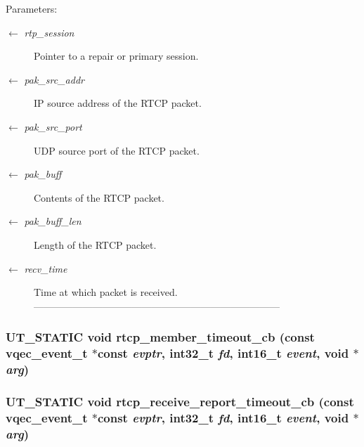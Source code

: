 \begin{Desc}
\item[Parameters:]
\begin{description}
\item[\mbox{$\leftarrow$} {\em rtp\_\-session}]Pointer to a repair or primary session. \item[\mbox{$\leftarrow$} {\em pak\_\-src\_\-addr}]IP source address of the RTCP packet. \item[\mbox{$\leftarrow$} {\em pak\_\-src\_\-port}]UDP source port of the RTCP packet. \item[\mbox{$\leftarrow$} {\em pak\_\-buff}]Contents of the RTCP packet. \item[\mbox{$\leftarrow$} {\em pak\_\-buff\_\-len}]Length of the RTCP packet. \item[\mbox{$\leftarrow$} {\em recv\_\-time}]Time at which packet is received. --------------------------------------------------------------------------- \end{description}
\end{Desc}
\subsubsection{\setlength{\rightskip}{0pt plus 5cm}UT\_\-STATIC void rtcp\_\-member\_\-timeout\_\-cb (const vqec\_\-event\_\-t $\ast$const  {\em evptr}, int32\_\-t {\em fd}, int16\_\-t {\em event}, void $\ast$ {\em arg})}\label{vqec__rtp_8c_534c39a263fb86479af049eeae743d1a}


\subsubsection{\setlength{\rightskip}{0pt plus 5cm}UT\_\-STATIC void rtcp\_\-receive\_\-report\_\-timeout\_\-cb (const vqec\_\-event\_\-t $\ast$const  {\em evptr}, int32\_\-t {\em fd}, int16\_\-t {\em event}, void $\ast$ {\em arg})}\label{vqec__rtp_8c_a6295412c34a0298b037597ac2b35ec6}


